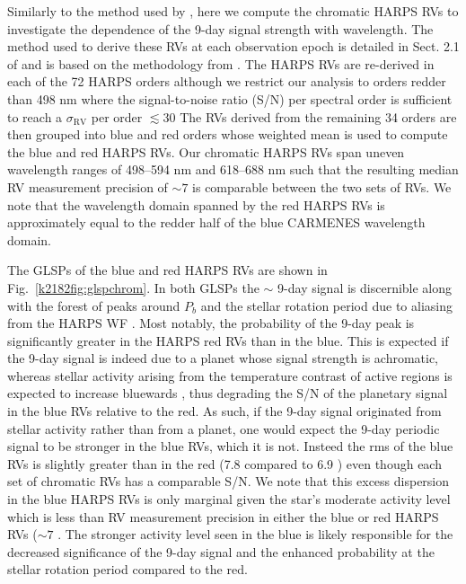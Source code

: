 Similarly to the method used by , here we compute the chromatic HARPS RVs to investigate the dependence of the
9-day signal strength with wavelength. The method used to derive these RVs at each observation epoch is detailed
in Sect. 2.1 of  and is based on the methodology from \cite{astudillodefru15}. 
The HARPS RVs are re-derived in each of the 72 HARPS orders although we restrict our analysis to
orders redder than 498 nm where the signal-to-noise ratio (S/N) per spectral order is sufficient to reach a
$\sigma_{\text{RV}}$ per order $\lesssim 30$  The RVs derived from the remaining 34 orders are then grouped into
blue and red orders whose weighted mean is used to compute the blue and red HARPS RVs. Our chromatic HARPS RVs
span uneven wavelength ranges of 498--594 nm and 618--688 nm such that the resulting median RV measurement precision of
$\sim 7$ \mps{} is comparable between the two sets of RVs. We note that the wavelength domain spanned by the red HARPS RVs
is approximately equal to the redder half of the blue CARMENES wavelength domain.

The GLSPs of the blue and red HARPS RVs are shown in Fig.~\ref{k2182fig:glspchrom}.
In both GLSPs the $\sim$ 9-day signal is discernible along with the forest of peaks around $P_b$ and the stellar
rotation period due to aliasing from the HARPS WF .
Most notably, the probability of the 9-day peak is significantly greater in the HARPS red RVs than in the blue.
This is expected if the 9-day signal is indeed due to a
planet whose signal strength is achromatic, whereas stellar activity arising from the temperature contrast of active
regions is expected to increase bluewards \citep{reiners10}, thus degrading the S/N of the planetary signal in the blue
RVs relative to the red. As such, if the 9-day signal  originated from stellar activity rather than from a
planet, one would expect the 9-day periodic signal to be stronger in the blue RVs, which it is not.
Insteed the rms of the blue RVs is slightly greater than in the red (7.8 \mps{} compared to 6.9 \mps{})
even though each set of chromatic RVs has a comparable S/N. We note that this excess dispersion in the blue HARPS RVs is
only marginal given the star's moderate activity level 
which is less than RV measurement precision in either the blue or red HARPS RVs ($\sim 7$ \mps{)}.
The stronger activity level seen in the blue is likely responsible for the decreased significance
of the 9-day signal and the enhanced probability at the stellar rotation period compared to the red.

